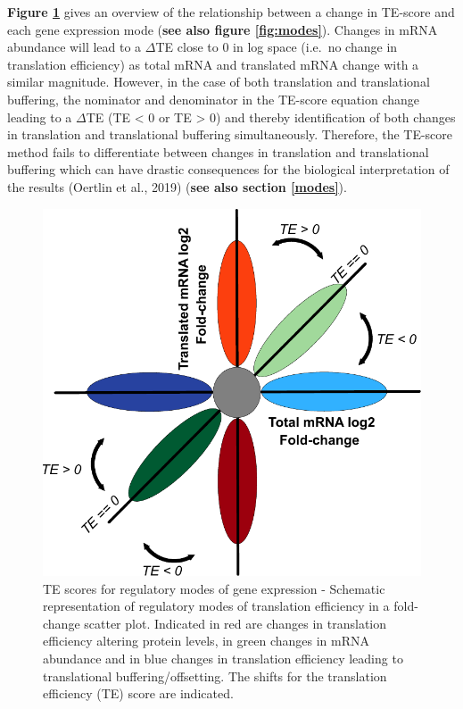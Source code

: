 \documentclass[12pt,openany]{book}
\begin{document}
\textbf{Figure \ref{fig:TE}} gives an overview of the relationship
between a change in TE-score and each gene expression mode (\textbf{see
also figure \ref{fig:modes}}). Changes in mRNA abundance will lead to a
\(\varDelta\)TE close to 0 in log space (i.e.~no change in translation
efficiency) as total mRNA and translated mRNA change with a similar
magnitude. However, in the case of both translation and translational
buffering, the nominator and denominator in the TE-score equation change
leading to a \(\varDelta\)TE (TE \textless{} 0 or TE \textgreater{} 0)
and thereby identification of both changes in translation and
translational buffering simultaneously. Therefore, the TE-score method
fails to differentiate between changes in translation and translational
buffering which can have drastic consequences for the biological
interpretation of the results (Oertlin et al., 2019) (\textbf{see also
section \ref{modes}}).

\begin{figure}
  \includegraphics{./figures/geneModes_TE.pdf}
  \caption{TE scores for regulatory modes of gene expression -  Schematic representation of regulatory modes of translation efficiency in a fold-change scatter plot. Indicated in red are changes in translation efficiency altering protein levels, in green changes in mRNA abundance and in blue changes in translation efficiency leading to translational buffering/offsetting. The shifts for the translation efficiency (TE) score are indicated. \label{fig:TE}}
\end{figure}
\end{document}
